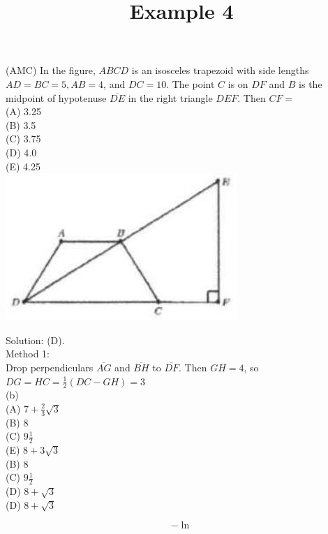 \documentclass{article}
\title{Example 4}
\date{}
\begin{document}
\maketitle

(AMC) In the figure, \(A B C D\) is an isosceles trapezoid with side lengths \(A D=B C=5, A B=4\), and \(D C=10\). The point \(C\) is on \(D F\) and \(B\) is the midpoint of hypotenuse \(\overline{D E}\) in the right triangle \(D E F\). Then \(C F=\)\\
(A) 3.25\\
(B) 3.5\\
(C) 3.75\\
(D) 4.0\\
(E) 4.25\\
\centering
\includegraphics[width=\textwidth]{images/076(1).jpg}

Solution: (D).\\
Method 1:\\
Drop perpendiculars \(\overline{A G}\) and \(\overline{B H}\) to \(\overline{D F}\). Then \(G H=4\), so \(D G=H C=\frac{1}{2}(D C-G H)=3\)\\
(b)\\
(A) \(7+\frac{2}{3} \sqrt{3}\)\\
(B) 8\\
(C) \(9 \frac{1}{2}\)\\
(E) \(8+3 \sqrt{3}\)\\
(B) 8\\
(C) \(9 \frac{1}{2}\)\\
(D) \(8+\sqrt{3}\)\\
(D) \(8+\sqrt{3}\)

\[
-\ln
\]
\end{document}
